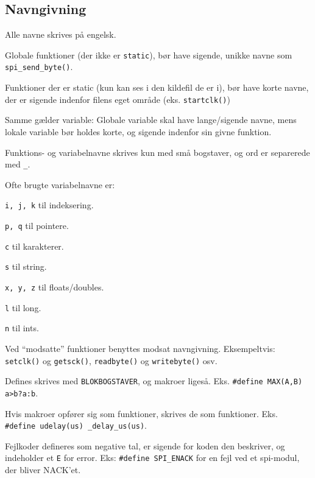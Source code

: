 \documentclass[article, 10pt]{memoir}
\let\tempone\itemize
\let\temptwo\enditemize
\renewenvironment{itemize}{\tempone\firmlist}{\temptwo}
\begin{document}
\begin{multicols}{2}
    \chapter{Navngivning}
    \begin{itemize}
    \item Alle navne skrives på engelsk.
    \item Globale funktioner (der ikke er \texttt{static}), bør have sigende, unikke navne som \texttt{spi\_send\_byte()}.
    \item Funktioner der er static (kun kan ses i den kildefil de er i), bør have korte navne, der er sigende indenfor filens eget område (eks. \texttt{startclk()})
    \item Samme gælder variable: Globale variable skal have lange/sigende navne, mens lokale variable bør holdes korte, og sigende indenfor sin givne funktion.
    \item Funktions- og variabelnavne skrives kun med små bogstaver, og ord er separerede med \texttt{\_}.
    \item Ofte brugte variabelnavne er:
        \begin{itemize}
        \item \texttt{i, j, k} til indeksering.
        \item \texttt{p, q} til pointere.
        \item \texttt{c} til karakterer.
        \item \texttt{s} til string.
        \item \texttt{x, y, z} til floats/doubles.
        \item \texttt{l} til long.
        \item \texttt{n} til ints.
        \end{itemize}
    \item Ved ``modsatte'' funktioner benyttes modsat navngivning. Eksempeltvis: \texttt{setclk()} og \texttt{getsck()}, \texttt{readbyte()} og \texttt{writebyte()} osv.
    \item Defines skrives med \texttt{BLOKBOGSTAVER}, og makroer ligeså. Eks. \texttt{\#define MAX(A,B) a>b?a:b}. 

        Hvis makroer opfører sig som funktioner, skrives de som funktioner. Eks. \texttt{\#define\ udelay(us) \_delay\_us(us)}.
    \item Fejlkoder defineres som negative tal, er sigende for koden den beskriver, og indeholder et \texttt{E} for error. Eks: \texttt{\#define SPI\_ENACK} for en fejl ved et spi-modul, der bliver NACK’et.
    \end{itemize}


\end{multicols}
\end{document}
